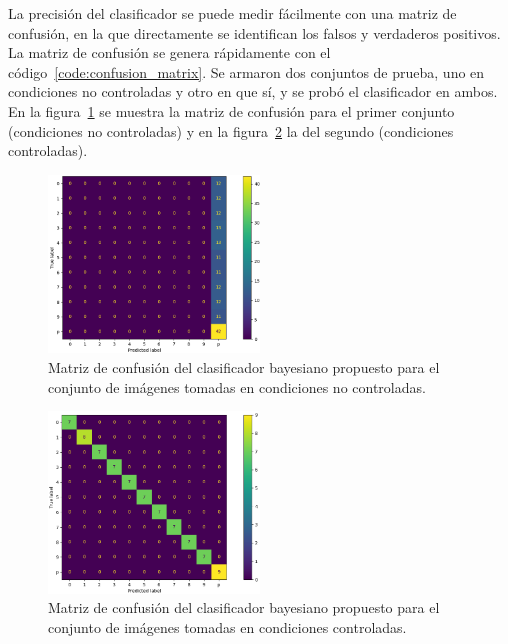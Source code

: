 La precisión del clasificador se puede medir fácilmente con una matriz de confusión, en la que directamente se identifican los falsos y verdaderos positivos.
La matriz de confusión se genera rápidamente con el código~\ref{code:confusion_matrix}.
Se armaron dos conjuntos de prueba, uno en condiciones no controladas y otro en que sí, y se probó el clasificador en ambos.
En la figura~\ref{fig:confusion_matrix_bad} se muestra la matriz de confusión para el primer conjunto (condiciones no controladas) y en la figura~\ref{fig:confusion_matrix_good} la del segundo (condiciones controladas).
\vfill
%
\begin{figure}[h!]
    \caption{Matriz de confusión del clasificador bayesiano propuesto para el conjunto de imágenes tomadas en condiciones no controladas.}
    \label{fig:confusion_matrix_bad}
    \centering
    \includegraphics[width=0.5\textwidth]{3_Reconocimiento/Figs/confusion_matrix_bad}
\end{figure}
%
\begin{figure}[h!]
    \caption{Matriz de confusión del clasificador bayesiano propuesto para el conjunto de imágenes tomadas en condiciones controladas.}
    \label{fig:confusion_matrix_good}
    \centering
    \includegraphics[width=0.5\textwidth]{3_Reconocimiento/Figs/confusion_matrix_good}
\end{figure}


